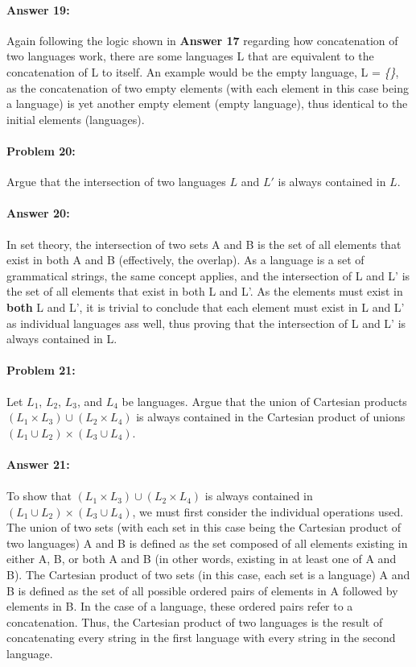 \documentclass[10pt]{article}
\begin{document}
\paragraph{Answer 19:} Again following the logic shown in \textbf{Answer 17} regarding how concatenation of two languages work, there are some languages L that are equivalent to the concatenation of L to itself. An example would be the empty language, L = \textit{\{\}}, as the concatenation of two empty elements (with each element in this case being a language) is yet another empty element (empty language), thus identical to the initial elements (languages). 

\hrulefill
\paragraph{Problem 20:}
Argue that the intersection of two languages $L$ and $L'$ is always
contained in $L$.

\paragraph{Answer 20:} In set theory, the intersection of two sets A and B is the set of all elements that exist in both A and B (effectively, the overlap). As a language is a set of grammatical strings, the same concept applies, and the intersection of L and L' is the set of all elements that exist in both L and L'. As the elements must exist in \textbf{both} L and L', it is trivial to conclude that each element must exist in L and L' as individual languages ass well, thus proving that the intersection of L and L' is always contained in L.

\hrulefill
\paragraph{Problem 21:}
Let $L_1$, $L_2$, $L_3$, and $L_4$ be languages. Argue that the union
of Cartesian products $(L_1 \times L_3) \cup (L_2 \times L_4)$ is
always contained in the Cartesian product of unions
$(L_1 \cup L_2) \times (L_3 \cup L_4)$.

\paragraph{Answer 21:} 
\paragraph{} To show that $(L_1 \times L_3) \cup (L_2 \times L_4)$ is always contained in $(L_1 \cup L_2) \times (L_3 \cup L_4)$, we must first consider the individual operations used. The union of two sets (with each set in this case being the Cartesian product of two languages) A and B is defined as the set composed of all elements existing in either A, B, or both A and B (in other words, existing in at least one of A and B). The Cartesian product of two sets (in this case, each set is a language) A and B is defined as the set of all possible ordered pairs of elements in A followed by elements in B. In the case of a language, these ordered pairs refer to a concatenation. Thus, the Cartesian product of two languages is the result of concatenating every string in the first language with every string in the second language. 
\end{document}
